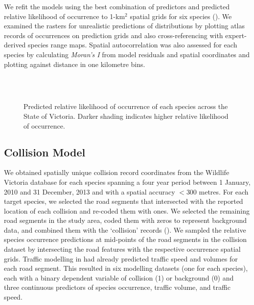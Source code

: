 We refit the models using the best combination of predictors and predicted relative likelihood of occurrence to 1-km$^2$ spatial grids for six species (). We examined the rasters for unrealistic predictions of distributions by plotting atlas records of occurrences on prediction grids and also cross-referencing with expert-derived species range maps. Spatial autocorrelation was also assessed for each species by calculating \textit{Moran's I} from model residuals and spatial coordinates and plotting against distance in one kilometre bins.

\begin{figure*}[!h]
  \centering
  \\
  \\  
  \caption[Predicted relative likelihood of six mammal species occurrence in Victoria]{Predicted relative likelihood of occurrence of each species across the State of Victoria. Darker shading indicates higher relative likelihood of occurrence.}
  \label{6sp_occ_preds}
\end{figure*}

\subsection{Collision Model}

We obtained spatially unique collision record coordinates from the Wildlife Victoria database for each species spanning a four year period between 1 January, 2010 and 31 December, 2013 and with a spatial accuracy $<$300 metres. For each target species, we selected the road segments that intersected with the reported location of each collision and re-coded them with ones.  We selected the remaining road segments in the study area, coded them with zeros to represent background data, and combined them with the `collision' records ().  We sampled the relative species occurrence predictions at mid-points of the road segments in the collision dataset by intersecting the road features with the respective occurrence spatial grids.  Traffic modelling in  had already predicted traffic speed and volumes for each road segment.  This resulted in six modelling datasets (one for each species), each with a binary dependent variable of collision (1) or background (0) and three continuous predictors of species occurrence, traffic volume, and traffic speed.

